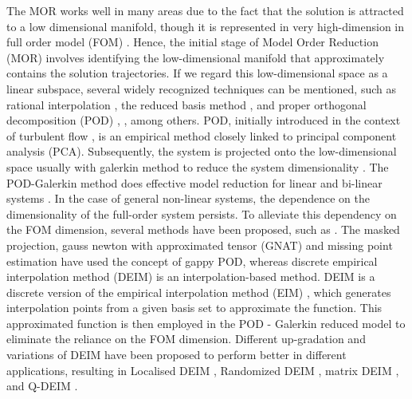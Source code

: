 \documentclass{article}
\begin{document}
The MOR works well in many areas due to the fact that the solution is attracted to a low dimensional manifold, though it is represented in very high-dimension in full order model (FOM) \cite{DEIM}. Hence, the initial stage of Model Order Reduction (MOR) involves identifying the low-dimensional manifold that approximately contains the solution trajectories. If we regard this low-dimensional space as a linear subspace, several widely recognized techniques can be mentioned, such as rational interpolation \cite{antoulas2020interpolatory}, the reduced basis method \cite{ReducedBasis}, and proper orthogonal decomposition (POD) \cite{PODTurbulent}, \cite{benner2015survey}, among others. POD, initially introduced in the context of turbulent flow \cite{PODTurbulent}, is an empirical method closely linked to principal component analysis (PCA).
Subsequently, the system is projected onto the low-dimensional space usually with galerkin method to reduce the system dimensionality \cite{benner2015survey,antoulas2010interpolatory}. The POD-Galerkin method does effective model reduction for linear and bi-linear systems \cite{DEIM}. In the case of general non-linear systems, the dependence on the dimensionality of the full-order system persists. To alleviate this dependency on the FOM dimension, several methods have been proposed, such as \cite{MPE,GNAT,DEIM,galbally,ChoiAPoints,ChoiAnLP}. The masked projection\cite{galbally}, gauss newton with approximated tensor (GNAT) \cite{GNAT} and missing point estimation \cite{MPE} have used the concept of gappy POD, whereas discrete empirical interpolation method (DEIM) \cite{DEIM} is an interpolation-based method. DEIM is a discrete version of the empirical interpolation method (EIM) \cite{EIM}, which generates interpolation points from a given basis set to approximate the function. This approximated function is then employed in the POD - Galerkin reduced model to eliminate the reliance on the FOM dimension. Different up-gradation and variations of DEIM have been proposed to perform better in different applications, resulting in Localised DEIM \cite{LDEIM}, Randomized DEIM \cite{RDEIM}, matrix DEIM \cite{MDEIM}, and Q-DEIM \cite{QDEIM}.
\end{document}
